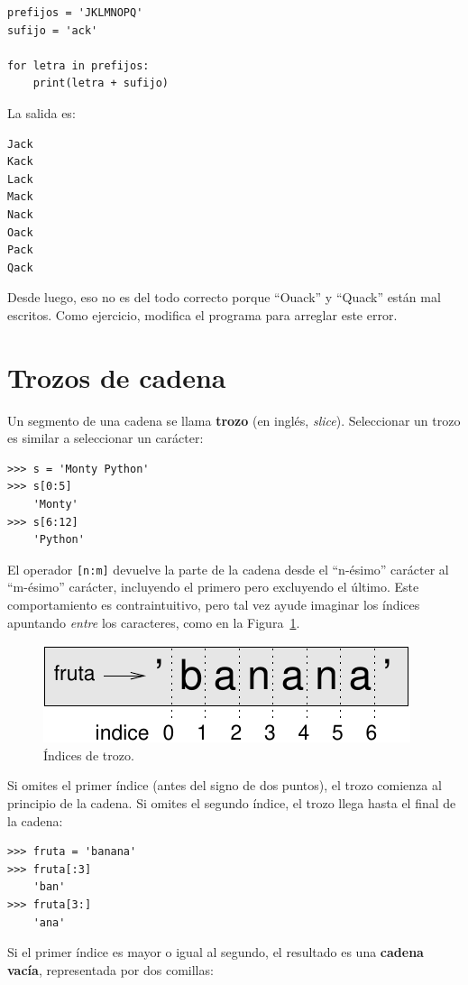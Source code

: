 \documentclass[10pt]{book}
\begin{document}
\begin{verbatim}
prefijos = 'JKLMNOPQ'
sufijo = 'ack'

for letra in prefijos:
    print(letra + sufijo)
\end{verbatim}
%
La salida es:

\begin{verbatim}
Jack
Kack
Lack
Mack
Nack
Oack
Pack
Qack
\end{verbatim}
%
Desde luego, eso no es del todo correcto porque ``Ouack'' y ``Quack'' están
mal escritos.  Como ejercicio, modifica el programa para arreglar este error.



\section{Trozos de cadena}
\label{slice}
  
  

Un segmento de una cadena se llama {\bf trozo} (en inglés, {\em slice}).  Seleccionar un trozo es
similar a seleccionar un carácter:

\begin{verbatim}
>>> s = 'Monty Python'
>>> s[0:5]
    'Monty'
>>> s[6:12]
    'Python'
\end{verbatim}
%
El operador {\tt [n:m]} devuelve la parte de la cadena desde el 
``n-ésimo'' carácter al ``m-ésimo'' carácter, incluyendo el primero pero
excluyendo el último.  Este comportamiento es contraintuitivo, pero tal vez
ayude imaginar los índices apuntando {\em entre} los
caracteres, como en la Figura~\ref{fig.banana}.

\begin{figure}
\centerline
{\includegraphics[scale=0.8]{figs/banana.pdf}}
\caption{Índices de trozo.}
\label{fig.banana}
\end{figure}

Si omites el primer índice (antes del signo de dos puntos), el trozo comienza al
principio de la cadena.  Si omites el segundo índice, el trozo
llega hasta el final de la cadena:

\begin{verbatim}
>>> fruta = 'banana'
>>> fruta[:3]
    'ban'
>>> fruta[3:]
    'ana'
\end{verbatim}
%
Si el primer índice es mayor o igual al segundo, el resultado
es una {\bf cadena vacía}, representada por dos comillas:
\end{document}
